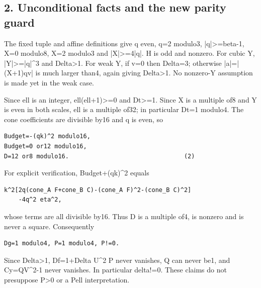 \subsection{2. Unconditional facts and the new parity guard}



The fixed tuple and affine definitions give q even, q=\allowbreak{}2 modulo3, |q|\textgreater{}\allowbreak{}=\allowbreak{}beta-1, X=\allowbreak{}0 modulo8, X=\allowbreak{}2 modulo3 and |X|\textgreater{}\allowbreak{}=\allowbreak{}4|q|. H is odd and nonzero. For cubic Y, |Y|\textgreater{}\allowbreak{}=\allowbreak{}|q|\textasciicircum{}\allowbreak{}3 and Delta\textgreater{}\allowbreak{}1. For weak Y, if v=\allowbreak{}0 then Delta=\allowbreak{}3; otherwise |a|=\allowbreak{}|(X+\allowbreak{}1)qv| is much larger than4, again giving Delta\textgreater{}\allowbreak{}1. No nonzero-Y assumption is made yet in the weak case.



Since ell is an integer, ell(ell+\allowbreak{}1)\textgreater{}\allowbreak{}=\allowbreak{}0 and Dt\textgreater{}\allowbreak{}=\allowbreak{}1. Since X is a multiple of8 and Y is even in both scales, ell is a multiple of32; in particular Dt=\allowbreak{}1 modulo4. The cone coefficients are divisible by16 and q is even, so



\begin{verbatim}
Budget=-(qk)^2 modulo16,
Budget=0 or12 modulo16,
D=12 or8 modulo16.                                (2)
\end{verbatim}

For explicit verification, Budget+\allowbreak{}(qk)\textasciicircum{}\allowbreak{}2 equals



\begin{verbatim}
k^2[2q(cone_A F+cone_B C)-(cone_A F)^2-(cone_B C)^2]
    -4q^2 eta^2,
\end{verbatim}

whose terms are all divisible by16. Thus D is a multiple of4, is nonzero and is never a square. Consequently



\begin{verbatim}
Dg=1 modulo4, P=1 modulo4, P!=0.
\end{verbatim}

Since Delta\textgreater{}\allowbreak{}1, Df=\allowbreak{}1+\allowbreak{}Delta U\textasciicircum{}\allowbreak{}2 P never vanishes, Q can never be1, and Cy=\allowbreak{}QV\textasciicircum{}\allowbreak{}2-1 never vanishes. In particular delta!=\allowbreak{}0. These claims do not presuppose P\textgreater{}\allowbreak{}0 or a Pell interpretation.



